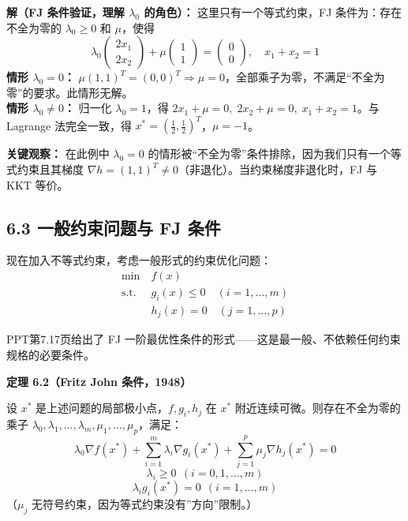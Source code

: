 \textbf{解（FJ 条件验证，理解 $\lambda_0$ 的角色）：}
这里只有一个等式约束，FJ 条件为：存在不全为零的 $\lambda_0\ge 0$ 和 $\mu$，使得
\[
\lambda_0\begin{pmatrix}2x_1\\2x_2\end{pmatrix}
+ \mu\begin{pmatrix}1\\1\end{pmatrix} = \begin{pmatrix}0\\0\end{pmatrix},\quad x_1+x_2=1
\]
\textbf{情形 $\lambda_0=0$：} $\mu(1,1)^T=(0,0)^T \Rightarrow \mu=0$，全部乘子为零，不满足“不全为零”的要求。此情形无解。\\
\textbf{情形 $\lambda_0\neq 0$：} 归一化 $\lambda_0=1$，得 $2x_1+\mu=0,\; 2x_2+\mu=0,\; x_1+x_2=1$。与 Lagrange 法完全一致，得 $x^*=(\frac12,\frac12)^T$，$\mu=-1$。

\begin{notebox}
\textbf{关键观察：} 在此例中 $\lambda_0=0$ 的情形被“不全为零”条件排除，因为我们只有一个等式约束且其梯度 $\nabla h=(1,1)^T\neq 0$（非退化）。当约束梯度非退化时，FJ 与 KKT 等价。
\end{notebox}

\subsection{6.3 一般约束问题与 FJ 条件}

现在加入不等式约束，考虑一般形式的约束优化问题：
\[
\begin{aligned}
\min\ & f(x) \\
\text{s.t.}\ & g_i(x) \le 0 \quad (i=1,\dots,m) \\
& h_j(x) = 0 \quad (j=1,\dots,p)
\end{aligned}
\]

PPT第7.17页给出了 FJ 一阶最优性条件的形式——这是最一般、不依赖任何约束规格的必要条件。

\medskip
{}
\medskip

\begin{defbox}
\textbf{定理 6.2（Fritz John 条件，1948）}

设 $x^*$ 是上述问题的局部极小点，$f,g_i,h_j$ 在 $x^*$ 附近连续可微。则存在不全为零的乘子 $\lambda_0,\lambda_1,\dots,\lambda_m,\mu_1,\dots,\mu_p$，满足：
\[
\boxed{\lambda_0 \nabla f(x^*) + \sum_{i=1}^m \lambda_i \nabla g_i(x^*) + \sum_{j=1}^p \mu_j \nabla h_j(x^*) = 0}
\]
\[
\lambda_i \ge 0\ \ (i=0,1,\dots,m)
\]
\[
\lambda_i g_i(x^*) = 0\ \ (i=1,\dots,m)
\]
（$\mu_j$ 无符号约束，因为等式约束没有”方向”限制。）
\end{defbox}

